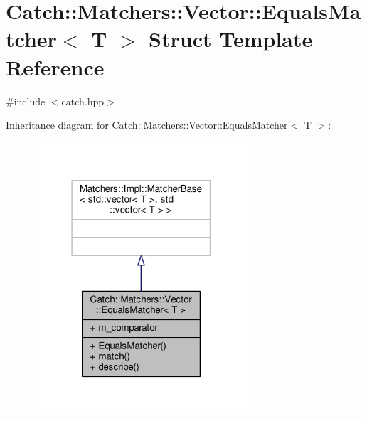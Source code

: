 \hypertarget{struct_catch_1_1_matchers_1_1_vector_1_1_equals_matcher}{\section{Catch\-:\-:Matchers\-:\-:Vector\-:\-:Equals\-Matcher$<$ T $>$ Struct Template Reference}
\label{struct_catch_1_1_matchers_1_1_vector_1_1_equals_matcher}
}


{\ttfamily \#include $<$catch.\-hpp$>$}



Inheritance diagram for Catch\-:\-:Matchers\-:\-:Vector\-:\-:Equals\-Matcher$<$ T $>$\-:
\nopagebreak
\begin{figure}[H]
\begin{center}
\leavevmode
\includegraphics[width=226pt]{struct_catch_1_1_matchers_1_1_vector_1_1_equals_matcher__inherit__graph}
\end{center}
\end{figure}


